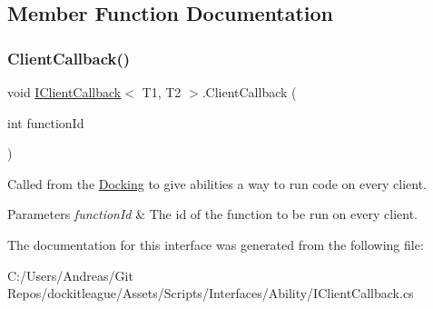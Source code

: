 \subsection{Member Function Documentation}
\hypertarget{interface_i_client_callback_ae3a4979dfd1f596661e996d05afacbdf}{}\label{interface_i_client_callback_ae3a4979dfd1f596661e996d05afacbdf} 
\subsubsection{\texorpdfstring{Client\+Callback()}{ClientCallback()}}
{\footnotesize\ttfamily void \hyperlink{interface_i_client_callback}{I\+Client\+Callback}$<$ T1, T2 $>$.Client\+Callback (\begin{DoxyParamCaption}\item[{int}]{function\+Id }\end{DoxyParamCaption})}



Called from the \hyperlink{class_docking}{Docking} to give abilities a way to run code on every client. 


\begin{DoxyParams}{Parameters}
{\em function\+Id} & The id of the function to be run on every client.\\
\hline
\end{DoxyParams}


The documentation for this interface was generated from the following file\+:\begin{DoxyCompactItemize}
\item 
C\+:/\+Users/\+Andreas/\+Git Repos/dockitleague/\+Assets/\+Scripts/\+Interfaces/\+Ability/I\+Client\+Callback.\+cs\end{DoxyCompactItemize}
